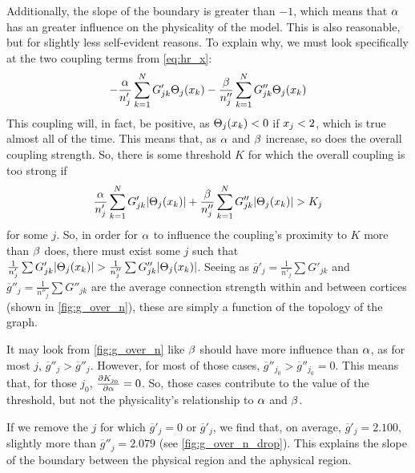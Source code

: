 Additionally, the slope of the boundary is greater than $-1$, which means that $\alpha$ has an greater influence on the physicality of the model.
This is also reasonable, but for slightly less self-evident reasons.
To explain why, we must look specifically at the two coupling terms from \cref{eq:hr_x}:
\[
  -\frac{\hra}{n'_{j}} \sum_{k = 1}^{N} G'_{j k} \Theta_{j}\pqty{\hrx_{k}}
  -
  \frac{\hrb}{n''_{j}} \sum_{k = 1}^{N} G''_{j k} \Theta_{j}\pqty{\hrx_{k}}
\]
This coupling will, in fact, be positive, as $\Theta_{j}\pqty{\hrx_{k}} < 0$ if $x_{j} < 2$, which is true almost all of the time.
This means that, as $\alpha$ and $\beta$ increase, so does the overall coupling strength.
So, there is some threshold $K$ for which the overall coupling is too strong if
\begin{equation}
  \label{eq:coupling_inequality}
  \frac{\hra}{n'_{j}} \sum_{k = 1}^{N} G'_{j k} \abs{\Theta_{j}\pqty{\hrx_{k}}}
  +
  \frac{\hrb}{n''_{j}} \sum_{k = 1}^{N} G''_{j k} \abs{\Theta_{j}\pqty{\hrx_{k}}}
  >
  K_{j}
\end{equation}
for some $j$.
So, in order for $\alpha$ to influence the coupling's proximity to $K$ more than $\beta$ does, there must exist some $j$ such that
$\frac{1}{n'_{j}} \sum G'_{j k} \abs{\Theta_{j}\pqty{\hrx_{k}}}
>
\frac{1}{n''_{j}} \sum G''_{j k} \abs{\Theta_{j}\pqty{\hrx_{k}}}$.
Seeing as $\overline{g}'_{j} = \frac{1}{n'_{j}} \sum G'_{j k}$ and $\overline{g}''_{j} = \frac{1}{n''_{j}} \sum G''_{j k}$ are the average connection strength within and between cortices (shown in \cref{fig:g_over_n}), these are simply a function of the topology of the graph.

It may look from \cref{fig:g_over_n} like $\beta$ should have more influence than $\alpha$, as for most $j$, $\overline{g}''_{j} > \overline{g}''_{j}$.
However, for most of those cases, $\overline{g}''_{j_{0}} > \overline{g}''_{j_{0}} = 0$.
This means that, for those $j_{0}$, $\pdv{K_{j_{0}}}{\alpha} = 0$.
So, those cases contribute to the value of the threshold, but not the physicality's relationship to $\alpha$ and $\beta$.

If we remove the $j$ for which $\overline{g}'_{j} = 0$ or $\overline{g}'_{j}$, we find that, on average, $\overline{g}'_{j} = 2.100$, slightly more than $\overline{g}''_{j} = 2.079$ (see \cref{fig:g_over_n_drop}).
This explains the slope of the boundary between the physical region and the aphysical region.

